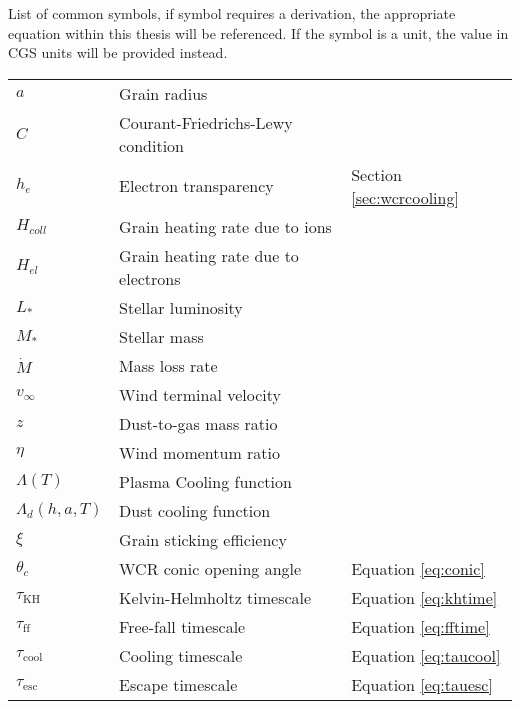 \begin{Common_Symbols}

List of common symbols, if symbol requires a derivation, the appropriate equation within this thesis will be referenced. If the symbol is a unit, the value in CGS units will be provided instead. 

\begin{longtable}[c]{l|l|l}
  \hline



  $a$ & Grain radius & \\
  $C$ & Courant-Friedrichs-Lewy condition & \\
  $h_e$ & Electron transparency & Section \ref{sec:wcrcooling} \\
  $H_{coll}$ & Grain heating rate due to ions & \\
  $H_{el}$ & Grain heating rate due to electrons & \\
  $L_*$ & Stellar luminosity & \\
  $M_*$ & Stellar mass & \\
  $\dot M$ & Mass loss rate & \\
  $v_\infty$ & Wind terminal velocity & \\
  $z$ & Dust-to-gas mass ratio  & \\


  $\eta$ & Wind momentum ratio  & \\
  
  $\Lambda(T)$ & Plasma Cooling function & \\
  $\Lambda_d(h,a,T)$ & Dust cooling function & \\

  $\xi$ & Grain sticking efficiency & \\

  $\theta_c$ & WCR conic opening angle & Equation \ref{eq:conic} \\
  
  $\tau_\text{KH}$ & Kelvin-Helmholtz timescale & Equation \ref{eq:khtime} \\
  $\tau_\text{ff}$ & Free-fall timescale & Equation \ref{eq:fftime} \\
  $\tau_\text{cool}$ & Cooling timescale & Equation \ref{eq:taucool} \\
  $\tau_\text{esc}$ & Escape timescale & Equation \ref{eq:tauesc} \\


\end{longtable}
\end{Common_Symbols}
